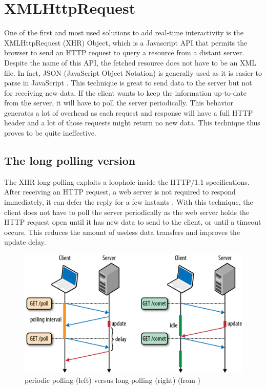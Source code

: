 \documentclass[10pt,journal,compsoc]{IEEEtran}
\begin{document}
\section{XMLHttpRequest}
\label{XHR}
One of the first and most used solutions to add real-time interactivity is the XMLHttpRequest (XHR) Object, which is a Javascript API that permits the browser to send an HTTP request to query a resource from a distant server. %
Despite the name of this API, the fetched resource does not have to be an XML file. %
In fact, JSON (JavaScript Object Notation) is generally used as it is easier to parse in JavaScript \cite{collinalatency}.
This technique is great to send data to the server but not for receiving new data.
If the client wants to keep the information up-to-date from the server, it will have to poll the server periodically.
This behavior generates a lot of overhead as each request and response will have a full HTTP header and a lot of those requests might return no new data. This technique thus proves to be quite ineffective. %

\subsection{The long polling version}

The XHR long polling exploits a loophole inside the \mbox{HTTP/1.1} specifications.
After receiving an HTTP request, a web server is not required to respond immediately, it can defer the reply for a few instants \cite{collinalatency}.
With this technique, the client does not have to poll the server periodically as the web server holds the HTTP request open until it has new data to send to the client, or until a timeout occurs.
This reduces the amount of useless data transfers and improves the update delay.

\begin{figure}[!ht]
  \centering
  \includegraphics[width=\linewidth]{poll_vs_lpoll}
  \caption{periodic polling (left) versus long polling (right) (from \cite{HighPerfBrowserNetworking:polling})}
  \label{poll_vs_lpoll}
\end{figure}
\end{document}
